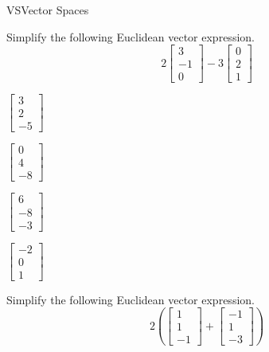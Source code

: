 \documentclass{article}
\begin{document}
\begin{module}{VS}{Vector Spaces}
\begin{readinessAssuranceTest}
\setcounter{enumi}{10}

\item Simplify the following Euclidean vector expression.
  \[
  2
  \begin{bmatrix}
    3 \\ -1 \\ 0
  \end{bmatrix}-
  3
  \begin{bmatrix}
    0 \\ 2 \\ 1
  \end{bmatrix}
  \]

\begin{multicols}{4}
\begin{readinessAssuranceTestChoices}
\item \(
        \begin{bmatrix}
          3 \\ 2 \\ -5
        \end{bmatrix}
      \)
\item \(
        \begin{bmatrix}
          0 \\ 4 \\ -8
        \end{bmatrix}
      \)
\item \(
        \begin{bmatrix}
          6 \\ -8 \\ -3
        \end{bmatrix}
      \) %
\item \(
        \begin{bmatrix}
          -2 \\ 0 \\ 1
        \end{bmatrix}
      \)
\end{readinessAssuranceTestChoices}
\end{multicols}

\item Simplify the following Euclidean vector expression.
  \[
  2\left(
  \begin{bmatrix}
    1 \\ 1 \\ -1
  \end{bmatrix}+
  \begin{bmatrix}
    -1 \\ 1 \\ -3
  \end{bmatrix}\right)
  \]


\end{readinessAssuranceTest}
\end{module}
\end{document}
